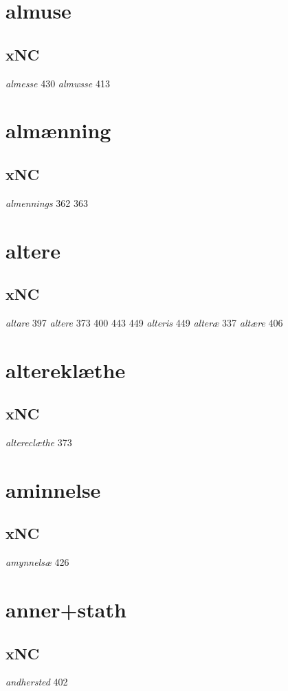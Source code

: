 \documentclass[a4paper,twocolumn]{article}
\begin{document}
\section{almuse}
\label{sec:orga85d946}
\subsection{xNC}
\label{sec:orgd7de22b}
\emph{almesse} 430 \emph{almwsse} 413 
\section{almænning}
\label{sec:orgea0bd4a}
\subsection{xNC}
\label{sec:org20b2e52}
\emph{almennings} 362 363 
\section{altere}
\label{sec:org483ac5f}
\subsection{xNC}
\label{sec:org6cf0ea5}
\emph{altare} 397 \emph{altere} 373 400 443 449 \emph{alteris} 449 \emph{alteræ} 337 \emph{altære} 406 
\section{altereklæthe}
\label{sec:org7374191}
\subsection{xNC}
\label{sec:org58c1b1b}
\emph{altereclæthe} 373 
\section{aminnelse}
\label{sec:org0d97adc}
\subsection{xNC}
\label{sec:org368cd62}
\emph{amynnelsæ} 426 
\section{anner+stath}
\label{sec:org04062c0}
\subsection{xNC}
\label{sec:org0928611}
\emph{andhersted} 402 
\end{document}
